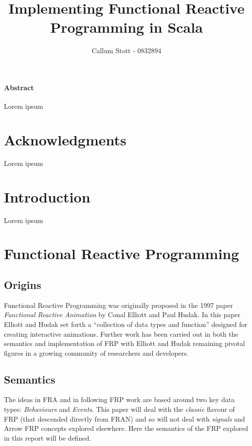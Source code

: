 \documentclass[12pt]{article}
\title{Implementing Functional Reactive Programming in Scala}
\author{Callum Stott - 0832894}
\begin{document}
  \maketitle
  \paragraph*{Abstract}
  Lorem ipsum
  
  \newpage
  \section*{Acknowledgments}
    Lorem ipsum
  
  \newpage
  \tableofcontents
  
  \newpage
  
  \section{Introduction}
  Lorem ipsum
  \section{Functional Reactive Programming}
    \subsection{Origins}
      Functional Reactive Programming was originally proposed in the 1997 paper \emph{Functional
      Reactive Animation} by Conal Elliott and Paul Hudak. In this paper Elliott and Hudak
      set forth a ``collection of data types and function'' designed for creating interactive 
      animations. Further work has been carried out in both the semantics and implementation
      of FRP with Elliott and Hudak remaining pivotal figures in a growing community of researchers
      and developers.
      
    \subsection{Semantics}
      The ideas in FRA and in following FRP work are based around two key data types: 
      \emph{Behaviours} and \emph{Events}. This paper will deal with the \emph{classic} flavour of
      FRP (that descended directly from FRAN) and so will not deal with \emph{signals} and Arrow FRP
      concepts explored elsewhere. Here the semantics of the FRP explored in this report will be defined.
      
\end{document}
